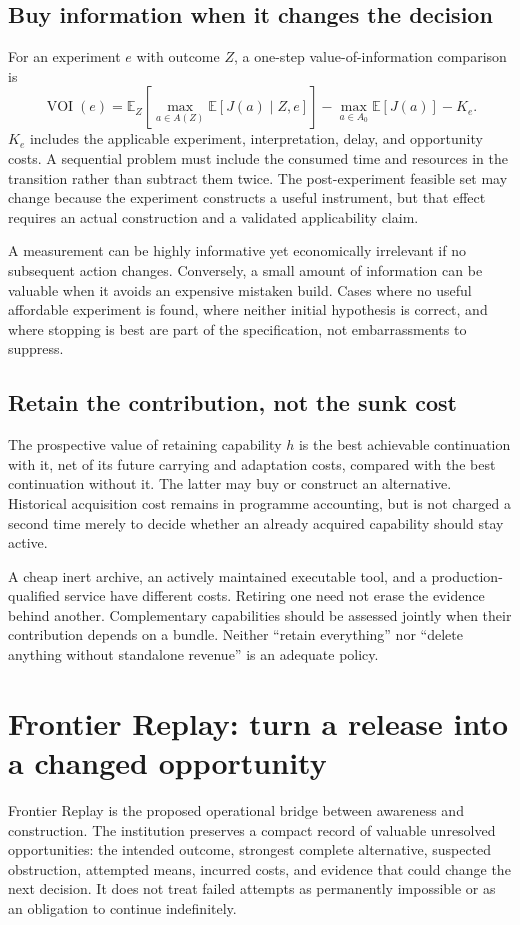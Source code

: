 \documentclass[11pt,letterpaper]{article}
\newcommand{\E}{\mathbb{E}}
\theoremstyle{remark}\newtheorem{remark}{Remark}[section]
\begin{document}
\subsection{Buy information when it changes the decision}
For an experiment $e$ with outcome $Z$, a one-step value-of-information comparison is
\begin{equation}
\operatorname{VOI}(e)=
\E_Z\!\left[\max_{a\in A(Z)}\E[J(a)\mid Z,e]\right]
-\max_{a\in A_0}\E[J(a)]-K_e.
\label{eq:voi}
\end{equation}
$K_e$ includes the applicable experiment, interpretation, delay, and opportunity costs. A sequential problem must include the consumed time and resources in the transition rather than subtract them twice. The post-experiment feasible set may change because the experiment constructs a useful instrument, but that effect requires an actual construction and a validated applicability claim.

A measurement can be highly informative yet economically irrelevant if no subsequent action changes. Conversely, a small amount of information can be valuable when it avoids an expensive mistaken build. Cases where no useful affordable experiment is found, where neither initial hypothesis is correct, and where stopping is best are part of the specification, not embarrassments to suppress.

\subsection{Retain the contribution, not the sunk cost}
The prospective value of retaining capability $h$ is the best achievable continuation with it, net of its future carrying and adaptation costs, compared with the best continuation without it. The latter may buy or construct an alternative. Historical acquisition cost remains in programme accounting, but is not charged a second time merely to decide whether an already acquired capability should stay active.

A cheap inert archive, an actively maintained executable tool, and a production-qualified service have different costs. Retiring one need not erase the evidence behind another. Complementary capabilities should be assessed jointly when their contribution depends on a bundle. Neither ``retain everything'' nor ``delete anything without standalone revenue'' is an adequate policy.

\section{Frontier Replay: turn a release into a changed opportunity}\label{sec:replay}
Frontier Replay is the proposed operational bridge between awareness and construction. The institution preserves a compact record of valuable unresolved opportunities: the intended outcome, strongest complete alternative, suspected obstruction, attempted means, incurred costs, and evidence that could change the next decision. It does not treat failed attempts as permanently impossible or as an obligation to continue indefinitely.
\end{document}
